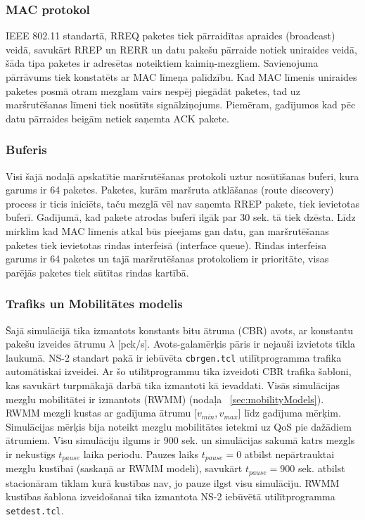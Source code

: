 \subsubsection{MAC protokol}
IEEE 802.11 standartā, RREQ paketes tiek pārraidītas apraides (broadcast) veidā, savukārt RREP un RERR un  datu pakešu pārraide notiek uniraides  veidā, šāda tipa paketes ir adresētas noteiktiem kaimiņ-mezgliem. Savienojuma pārrāvums tiek konstatēts ar MAC līmeņa palīdzību. Kad MAC līmenis uniraides paketes posmā otram mezglam vairs nespēj piegādāt paketes, tad uz maršrutēšanas līmeni tiek nosūtīts signālziņojums. Piemēram, gadījumos kad pēc datu pārraides beigām netiek saņemta ACK pakete.

\subsubsection{Buferis}
Visi šajā nodaļā apskatītie maršrutēšanas protokoli uztur nosūtīšanas buferi, kura garums ir 64 paketes. Paketes, kurām maršruta atklāšanas (route discovery) process ir ticis iniciēts, taču mezglā vēl nav saņemta RREP pakete, tiek ievietotas buferī. Gadījumā, kad pakete atrodas buferī ilgāk par 30 sek. tā tiek dzēsta. Līdz mirklim kad MAC līmenis atkal būs pieejams gan datu, gan maršrutēšanas paketes tiek ievietotas rindas interfeisā (interface queue). Rindas interfeisa garums ir 64 paketes un tajā maršrutēšanas protokoliem ir prioritāte, visas parējās paketes tiek sūtītas rindas kartībā.

\subsubsection{Trafiks un Mobilitātes modelis}
Šajā simulācijā tika izmantots konstants bitu ātruma (\acs{CBR}) avots, ar konstantu pakešu izveides ātrumu $\lambda$ [pck/s]. Avots-galamērķis pāris ir nejauši izvietots tīkla laukumā. NS-2 standart pakā ir iebūvēta \texttt{cbrgen.tcl} utilītprogramma trafika automātiskai izveidei. Ar šo utilītprogrammu tika izveidoti CBR trafika šabloni, kas savukārt turpmākajā darbā tika izmantoti kā ievaddati. Visās simulācijas mezglu mobilitātei ir izmantots (\acs{RWMM}) (\seename nodaļa ~\ref{sec:mobilityModels}). \acf{RWMM} mezgli kustas ar gadījuma ātrumu [$v_{min}, v_{max}$] līdz gadījuma mērķim. Simulācijas mērķis bija noteikt mezglu mobilitātes ietekmi uz QoS pie dažādiem ātrumiem. Visu simulāciju ilgums ir 900 sek. un simulācijas sakumā katrs mezgls ir nekustīgs $t_{pause}$ laika periodu.
Pauzes laiks $t_{pause} = 0$ atbilst nepārtrauktai mezglu kustībai (saskaņā ar RWMM modeli), savukārt $t_{pause} = 900$ sek. atbilst stacionāram tīklam kurā kustības nav, jo pauze ilgst visu simulāciju. RWMM kustības šablona izveidošanai tika izmantota NS-2 iebūvētā utilītprogramma \texttt{setdest.tcl}.

